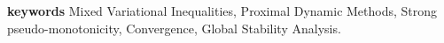 \documentclass{article}
\theoremstyle{plain}%
\theoremstyle{thmstyletwo}%
\theoremstyle{thmstylethree}%
\begin{document}
% 
% 
% 

{\bf keywords} {Mixed Variational Inequalities, Proximal Dynamic Methods,  Strong pseudo-monotonicity, Convergence, Global Stability Analysis.}


\end{document}
